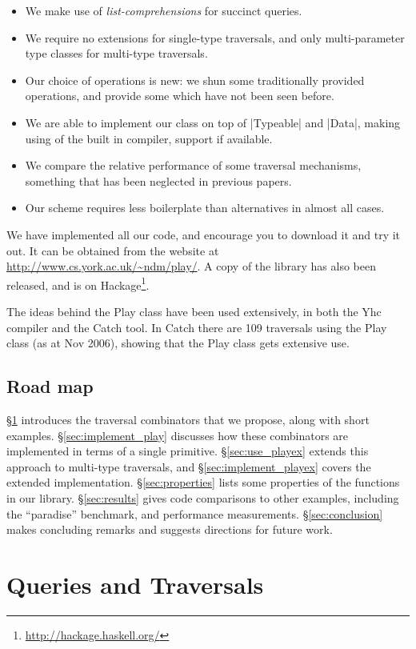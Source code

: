 \documentclass[preprint]{sigplanconf}
\begin{document}
\begin{itemize}
\item We make use of \textit{list-comprehensions} for succinct queries.
\item We require no extensions for single-type traversals, and only multi-parameter type classes for multi-type traversals.
\item Our choice of operations is new: we shun some traditionally provided operations, and provide some which have not been seen before.
\item We are able to implement our class on top of |Typeable| and |Data|, making using of the built in compiler, support if available.
\item We compare the relative performance of some traversal mechanisms, something that has been neglected in previous papers.
\item Our scheme requires less boilerplate than alternatives in almost all cases.
\end{itemize}

We have implemented all our code, and encourage you to download it and try it out. It can be obtained from the website at \url{http://www.cs.york.ac.uk/~ndm/play/}. A copy of the library has also been released, and is on Hackage\footnote{\url{http://hackage.haskell.org/}}.

The ideas behind the Play class have been used extensively, in both the Yhc compiler and the Catch tool. In Catch there are 109 traversals using the Play class (as at Nov 2006), showing that the Play class gets extensive use.

\subsection{Road map}

\S\ref{sec:use_play} introduces the traversal combinators that we propose, along with short examples. \S\ref{sec:implement_play} discusses how these combinators are implemented in terms of a single primitive. \S\ref{sec:use_playex} extends this approach to multi-type traversals, and \S\ref{sec:implement_playex} covers the extended implementation. \S\ref{sec:properties} lists some properties of the functions in our library. \S\ref{sec:results} gives code comparisons to other examples, including the ``paradise'' benchmark, and performance measurements. \S\ref{sec:conclusion} makes concluding remarks and suggests directions for future work.


\section{Queries and Traversals}
\label{sec:use_play}
\end{document}
